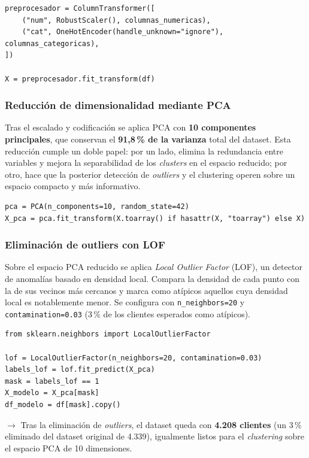\documentclass[11pt,a4paper]{article}
\begin{document}
\begin{lstlisting}
preprocesador = ColumnTransformer([
    ("num", RobustScaler(), columnas_numericas),
    ("cat", OneHotEncoder(handle_unknown="ignore"), columnas_categoricas),
])

X = preprocesador.fit_transform(df)
\end{lstlisting}

\subsubsection{Reducción de dimensionalidad mediante PCA}

Tras el escalado y codificación se aplica PCA con \textbf{10 componentes principales}, que conservan el \textbf{91,8\,\% de la varianza} total del dataset. Esta reducción cumple un doble papel: por un lado, elimina la redundancia entre variables y mejora la separabilidad de los \textit{clusters} en el espacio reducido; por otro, hace que la posterior detección de \textit{outliers} y el clustering operen sobre un espacio compacto y más informativo.

\begin{lstlisting}
pca = PCA(n_components=10, random_state=42)
X_pca = pca.fit_transform(X.toarray() if hasattr(X, "toarray") else X)
\end{lstlisting}

\subsubsection{Eliminación de outliers con LOF}

Sobre el espacio PCA reducido se aplica \textit{Local Outlier Factor} (LOF), un detector de anomalías basado en densidad local. Compara la densidad de cada punto con la de sus vecinos más cercanos y marca como atípicos aquellos cuya densidad local es notablemente menor. Se configura con \texttt{n\_neighbors=20} y \texttt{contamination=0.03} (3\,\% de los clientes esperados como atípicos).

\begin{lstlisting}
from sklearn.neighbors import LocalOutlierFactor

lof = LocalOutlierFactor(n_neighbors=20, contamination=0.03)
labels_lof = lof.fit_predict(X_pca)
mask = labels_lof == 1
X_modelo = X_pca[mask]
df_modelo = df[mask].copy()
\end{lstlisting}

\noindent$\rightarrow$ Tras la eliminación de \textit{outliers}, el dataset queda con \textbf{4.208 clientes} (un 3\,\% eliminado del dataset original de 4.339), igualmente listos para el \textit{clustering} sobre el espacio PCA de 10 dimensiones.
\end{document}
